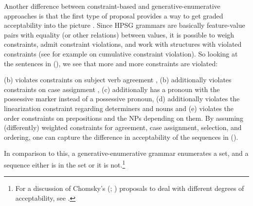 \documentclass[output=paper
 	        ,biblatex
                ,babelshorthands
                ,newtxmath
                ,draftmode
                ,colorlinks, citecolor=brown
]{langscibook}
\begin{document}
Another difference between constraint-based and generative-enumerative approaches is that the first
type of proposal provides a way to get graded acceptability into the picture
\citep[Section~3.1]{PS2001a}. Since HPSG grammars are basically feature-value pairs with equality
(or other relations) between values, it is possible to weigh constraints, admit constraint
violations, and work with structures with violated constraints (see for example \citealp{SK2005a} on
cumulative constraint violation). So looking at the sentences in (), we see that more and
more constraints are violated:

\eal
{}
\zl
(b) violates constraints on subject verb agreement
, (b) additionally
violates constraints on case assignment , (c) additionally has a pronoun with the
possessive marker instead of a possessive pronoun, (d) additionally violates the
linearization constraint regarding determiners and nouns  and (e)
violates the order constraints on prepositions and the NPs depending on them. By assuming
(differently) weighted constraints for agreement, case assignment, selection, and ordering, one can
capture the difference in acceptability of the sequences in ().

In comparison to this, a generative-enumerative grammar enumerates a set, and a
sequence either is in the set or it is not.\footnote{%
For a discussion of Chomsky's
(\citeyear{Chomsky64a}; \citeyear[Chapter~5]{Chomsky75a}) proposals to deal with different degrees
of acceptability, see .
}

\end{document}
